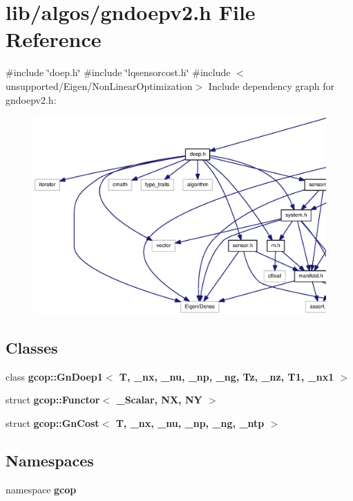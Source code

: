 \section{lib/algos/gndoepv2.h \-File \-Reference}
\label{gndoepv2_8h}
{\ttfamily \#include \char`\"{}doep.\-h\char`\"{}}\*
{\ttfamily \#include \char`\"{}lqsensorcost.\-h\char`\"{}}\*
{\ttfamily \#include $<$unsupported/\-Eigen/\-Non\-Linear\-Optimization$>$}\*
\-Include dependency graph for gndoepv2.\-h\-:\nopagebreak
\begin{figure}[H]
\begin{center}
\leavevmode
\includegraphics[width=350pt]{gndoepv2_8h__incl}
\end{center}
\end{figure}
\subsection*{\-Classes}
\begin{DoxyCompactItemize}
\item 
class {\bf gcop\-::\-Gn\-Doep1$<$ T, \-\_\-nx, \-\_\-nu, \-\_\-np, \-\_\-ng, Tz, \-\_\-nz, T1, \-\_\-nx1 $>$}
\item 
struct {\bf gcop\-::\-Functor$<$ \-\_\-\-Scalar, N\-X, N\-Y $>$}
\item 
struct {\bf gcop\-::\-Gn\-Cost$<$ T, \-\_\-nx, \-\_\-nu, \-\_\-np, \-\_\-ng, \-\_\-ntp $>$}
\end{DoxyCompactItemize}
\subsection*{\-Namespaces}
\begin{DoxyCompactItemize}
\item 
namespace {\bf gcop}
\end{DoxyCompactItemize}
